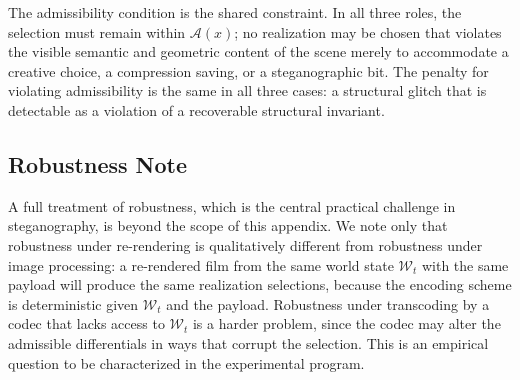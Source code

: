 \documentclass[12pt,a4paper]{article}
\theoremstyle{plain}
\theoremstyle{definition}
\theoremstyle{remark}
\begin{document}
The admissibility condition is the shared constraint. In all three roles, the selection must remain within $\mathcal{A}(x)$; no realization may be chosen that violates the visible semantic and geometric content of the scene merely to accommodate a creative choice, a compression saving, or a steganographic bit. The penalty for violating admissibility is the same in all three cases: a structural glitch that is detectable as a violation of a recoverable structural invariant.

\subsection{Robustness Note}

A full treatment of robustness, which is the central practical challenge in steganography, is beyond the scope of this appendix. We note only that robustness under re-rendering is qualitatively different from robustness under image processing: a re-rendered film from the same world state $\mathcal{W}_t$ with the same payload will produce the same realization selections, because the encoding scheme is deterministic given $\mathcal{W}_t$ and the payload. Robustness under transcoding by a codec that lacks access to $\mathcal{W}_t$ is a harder problem, since the codec may alter the admissible differentials in ways that corrupt the selection. This is an empirical question to be characterized in the experimental program.
\end{document}
